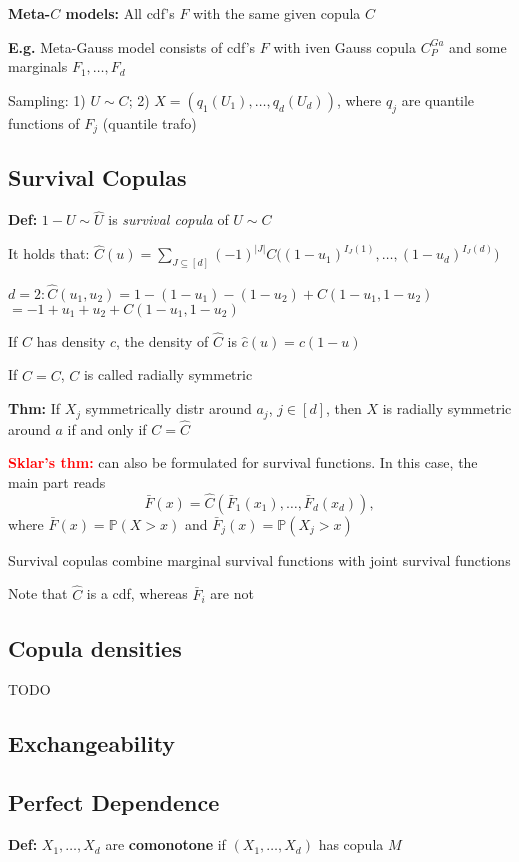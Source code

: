 \textbf{Meta-$C$ models:} All cdf's $F$ with the same given copula $C$

\textbf{E.g.} Meta-Gauss model consists of cdf's $F$ with iven Gauss copula $C^{Ga}_P$ and some marginals $F_1,\dots,F_d$

Sampling: 1) $U\sim C$; 2) $X=(q_1(U_1),\dots, q_d(U_d))$, where $q_j$ are quantile functions of $F_j$ (quantile trafo)

\subsection*{Survival Copulas}
\textbf{Def:} $1-U\sim\hat U$ is \textit{survival copula} of $U\sim C$

It holds that: $\hat C(u)=\sum_{J\subseteq [d]} (-1)^{|J|} C\bigg( (1-u_1)^{I_J(1)},\dots,(1-u_d)^{I_J(d)} \bigg)$

$d=2: \hat C(u_1,u_2)=1-(1-u_1)-(1-u_2)+C(1-u_1,1-u_2)$ $=-1+u_1+u_2+C(1-u_1,1-u_2)$

If $C$ has density $c$, the density of $\hat C$ is $\hat c(u)=c(1-u)$

If $\hat C=C$, $C$ is called radially symmetric

\textbf{Thm:} If $X_j$ symmetrically distr around $a_j$, $j\in[d]$, then $X$ is radially symmetric around $a$ if and only if $C=\hat C$

\textbf{\textcolor{red}{Sklar's thm:}} can also be formulated for survival functions. In this case, the main part reads
\[ \bar F(x) = \hat C(\bar F_1(x_1), \dots, \bar F_d(x_d)), \]
where $\bar F(x)=\mathbb{P}(X>x)$ and $\bar F_j(x)=\mathbb{P}(X_j>x)$

Survival copulas combine marginal survival functions with joint survival functions

Note that $\hat C$ is a cdf, whereas $\bar F_i$ are not

\subsection*{Copula densities}
TODO

\subsection*{Exchangeability}

\subsection*{Perfect Dependence}
\textbf{Def:} $X_1,\dots,X_d$ are \textbf{comonotone} if $(X_1,\dots,X_d)$ has copula $M$

